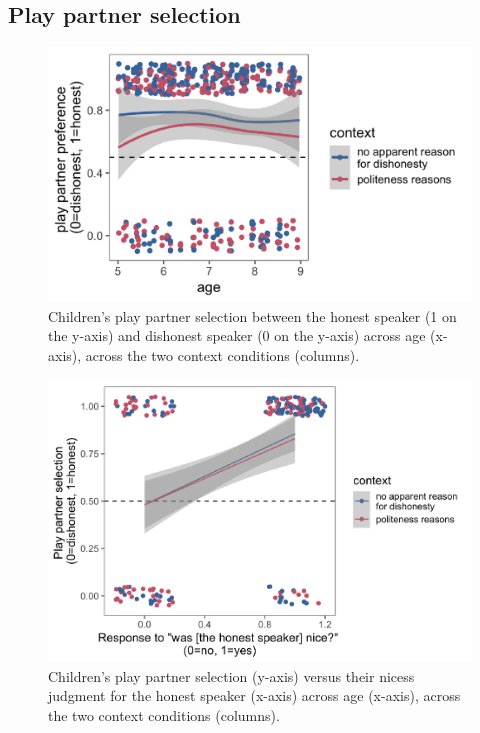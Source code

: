 \documentclass[oneside]{report}
\begin{document}
\subsection{Play partner selection}\label{play-partner-selection}
\begin{figure}[t]

{\centering \includegraphics[width=0.9\linewidth]{erica_yoon_dissertation_files/figure-latex/figTrupolPlayPlacement-1} 

}

\caption[Play partner selection in the experiment in Chapter 3.]{Children's play partner selection between the honest speaker (1 on the y-axis) and dishonest speaker (0 on the y-axis) across age (x-axis), across the two context conditions (columns).}\label{fig:figTrupolPlayPlacement}
\end{figure}
\begin{figure}[t]

{\centering \includegraphics[width=0.9\linewidth]{erica_yoon_dissertation_files/figure-latex/figTrupolPlayNicePlacement-1} 

}

\caption[Play partner selection versus niceness judgment for the honest speaker in the experiment in Chapter 3.]{Children's play partner selection (y-axis) versus their nicess judgment for the honest speaker (x-axis) across age (x-axis), across the two context conditions (columns).}\label{fig:figTrupolPlayNicePlacement}
\end{figure}
\end{document}
